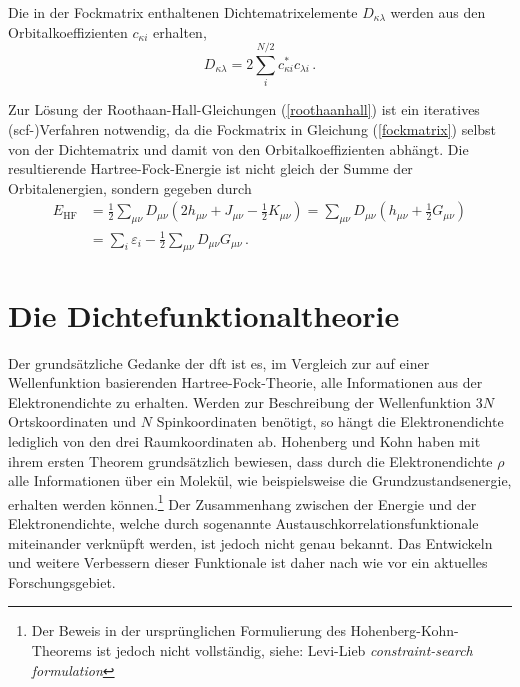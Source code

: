 Die in der Fockmatrix enthaltenen Dichtematrixelemente $D_{\kappa\lambda}$ werden aus den Orbitalkoeffizienten $c_{\kappa i}$ erhalten,
\begin{equation}
D_{\kappa\lambda}=2\sum_{i}^{N/2} c_{\kappa i}^* c_{\lambda i}\, .
\end{equation}

Zur Lösung der Roothaan-Hall-Gleichungen (\ref{roothaanhall}) ist ein iteratives \mbox{(\acs{scf}-)}Verfahren notwendig, da die Fockmatrix in Gleichung (\ref{fockmatrix}) selbst von der Dichtematrix und damit von den Orbitalkoeffizienten abhängt. Die resultierende Hartree-Fock-Energie ist nicht gleich der Summe der Orbitalenergien, sondern gegeben durch
\begin{equation}
\begin{aligned}
E_{\textrm{HF}}&=\frac{1}{2}\sum_{\mu\nu}D_{\mu\nu}(2h_{\mu\nu}+J_{\mu\nu}-\frac{1}{2} K_{\mu\nu})=\sum_{\mu\nu}D_{\mu\nu}(h_{\mu\nu}+\frac{1}{2}G_{\mu\nu})\\
&=\sum_i\varepsilon_i-\frac{1}{2}\sum_{\mu\nu}D_{\mu\nu}G_{\mu\nu}\, .
\end{aligned}
\label{hfenergie}
\end{equation}

\section{Die Dichtefunktionaltheorie}\label{kap:dft}

Der grundsätzliche Gedanke der \acf{dft} ist es, im Vergleich zur auf einer Wellenfunktion basierenden Hartree-Fock-Theorie, alle Informationen aus der Elektronendichte zu erhalten. Werden zur Beschreibung der Wellenfunktion $3N$ Ortskoordinaten und $N$ Spinkoordinaten benötigt, so hängt die Elektronendichte lediglich von den drei Raumkoordinaten ab. Hohenberg und Kohn\supercite{hohenberg1964inhomogeneous} haben mit ihrem ersten Theorem grundsätzlich bewiesen, dass durch die Elektronendichte $\rho$ alle Informationen über ein Molekül, wie beispielsweise die Grundzustandsenergie, erhalten werden können.\footnote{Der Beweis in der ursprünglichen Formulierung des Hohenberg-Kohn-Theorems ist jedoch nicht vollständig, siehe: Levi-Lieb \textit{constraint-search formulation}} Der Zusammenhang zwischen der Energie und der Elektronendichte, welche durch sogenannte Austauschkorrelationsfunktionale miteinander verknüpft werden, ist jedoch nicht genau bekannt. Das Entwickeln und weitere Verbessern dieser Funktionale ist daher nach wie vor ein aktuelles Forschungsgebiet.  

